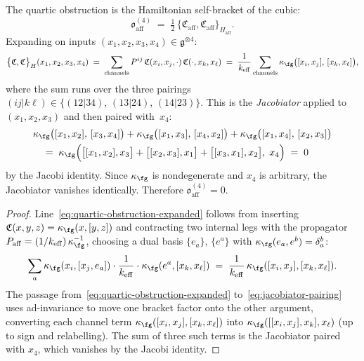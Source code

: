 \begin{proposition}\label{prop:affine-jacobi-quartic-vanishing}
The quartic obstruction is the Hamiltonian self-bracket of the cubic:
\begin{equation}\label{eq:quartic-obstruction-self-bracket}
\mathfrak{o}_{\mathrm{aff}}^{(4)}
\;=\;
\tfrac{1}{2}\,
\bigl\{\mathfrak{C}_{\mathrm{aff}},
\mathfrak{C}_{\mathrm{aff}}\bigr\}_{H_{\mathrm{aff}}}.
\end{equation}
Expanding on inputs $(x_1,x_2,x_3,x_4) \in \mathfrak{g}^{\otimes 4}$:
\begin{equation}\label{eq:quartic-obstruction-expanded}
\bigl\{\mathfrak{C},\mathfrak{C}\bigr\}_H
(x_1,x_2,x_3,x_4)
\;=\;
\sum_{\mathrm{channels}} P^{ij}\,
\mathfrak{C}(x_i,x_j,\cdot)\,
\mathfrak{C}(\cdot,x_k,x_\ell)
\;=\;
\frac{1}{k_{\mathrm{eff}}}
\sum_{\mathrm{channels}}
\kappa_{\fg}\bigl([x_i,x_j],\,[x_k,x_\ell]\bigr),
\end{equation}
where the sum runs over the three pairings
$(ij|k\ell) \in \{(12|34),\,(13|24),\,(14|23)\}$.
This is the \emph{Jacobiator} applied to $(x_1,x_2,x_3)$
and then paired with~$x_4$:
\begin{align}
\label{eq:jacobiator-pairing}
&\kappa_{\fg}\bigl([x_1,x_2],\,[x_3,x_4]\bigr)
+ \kappa_{\fg}\bigl([x_1,x_3],\,[x_4,x_2]\bigr)
+ \kappa_{\fg}\bigl([x_1,x_4],\,[x_2,x_3]\bigr)
\\
&\quad=\;
\kappa_{\fg}\Bigl(
 \bigl[[x_1,x_2],x_3\bigr]
 + \bigl[[x_2,x_3],x_1\bigr]
 + \bigl[[x_3,x_1],x_2\bigr],\;
 x_4
\Bigr)
\;=\; 0
\notag
\end{align}
by the Jacobi identity. Since $\kappa_{\fg}$ is nondegenerate and
$x_4$ is arbitrary, the Jacobiator vanishes identically.
Therefore $\mathfrak{o}_{\mathrm{aff}}^{(4)} = 0$.
\end{proposition}

\begin{proof}
Line~\eqref{eq:quartic-obstruction-expanded} follows from
inserting $\mathfrak{C}(x,y,z) = \kappa_{\fg}(x,[y,z])$ and contracting
two internal legs with the propagator
$P_{\mathrm{aff}} = (1/k_{\mathrm{eff}})\,\kappa_{\fg}^{-1}$, choosing a
dual basis $\{e_a\}$, $\{e^a\}$ with
$\kappa_{\fg}(e_a,e^b) = \delta_a^b$:
\[
\sum_a \kappa_{\fg}(x_i,[x_j,e_a])\cdot
\frac{1}{k_{\mathrm{eff}}}\cdot
\kappa_{\fg}(e^a,[x_k,x_\ell])
\;=\;
\frac{1}{k_{\mathrm{eff}}}\,
\kappa_{\fg}([x_i,x_j],[x_k,x_\ell]).
\]
The passage from~\eqref{eq:quartic-obstruction-expanded}
to~\eqref{eq:jacobiator-pairing} uses ad-invariance to move one
bracket factor onto the other argument, converting each channel
term $\kappa_{\fg}([x_i,x_j],[x_k,x_\ell])$ into
$\kappa_{\fg}([[x_i,x_j],x_k],x_\ell)$ (up to sign and relabelling).
The sum of three such terms is the Jacobiator paired with $x_4$,
which vanishes by the Jacobi identity.
\end{proof}

